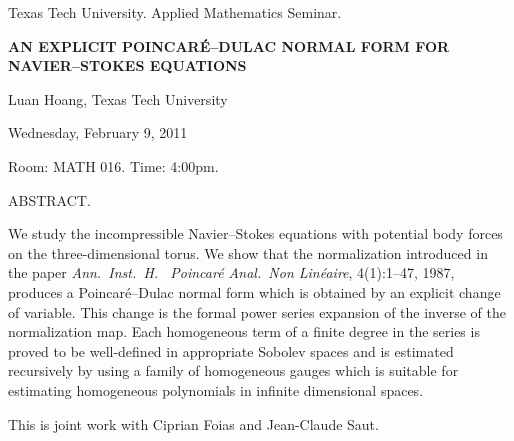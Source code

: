 \documentclass[oneside]{amsart}
\newcommand{\talktitle}{An explicit Poincar\'e--Dulac normal form for Navier--Stokes equations}
\newcommand{\talkspeaker}{Luan Hoang, Texas Tech University}
\newcommand{\talkdate}{Wednesday, February 9, 2011}
\newcommand{\talkabstract}{
We study the incompressible Navier--Stokes equations with potential body forces on the three-dimensional torus.
We show that the normalization introduced in the paper {\em Ann.~Inst.~H.~ Poincar\'e Anal.~Non Lin\'eaire}, 4(1):1--47, 1987, produces a Poincar\'e--Dulac normal form which is obtained by an explicit change of variable.
This change is the formal power series expansion of the inverse of the normalization map.
Each homogeneous term of a finite degree in the series is proved to be well-defined in appropriate Sobolev spaces and is estimated recursively by using a family of homogeneous gauges  which is suitable for estimating homogeneous polynomials in infinite dimensional spaces.

This is joint work with Ciprian Foias and Jean-Claude Saut.
}
\begin{document}
\thispagestyle{empty}

\begin{center}
Texas Tech University.  Applied Mathematics Seminar.

\end{center}

\begin{center}

\textbf{\LARGE {\uppercase{\talktitle}} }

\talkspeaker

\talkdate

Room: MATH 016.  Time: 4:00pm.

\end{center}

ABSTRACT.
\talkabstract
\end{document}
